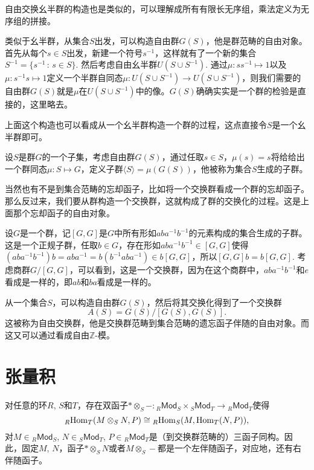 自由交换幺半群的构造也是类似的，可以理解成所有有限长无序组，乘法定义为无序组的拼接。

\begin{para}
类似于幺半群，从集合$S$出发，可以构造自由群$G(S)$，他是群范畴的自由对象。首先从每个$s\in S$出发，新建一个符号$s^{-1}$，这样就有了一个新的集合$S^{-1}=\{s^{-1}\,:\, s\in S\}$. 然后考虑自由幺半群$U(S\cup S^{-1})$. 通过$\mu: ss^{-1}\mapsto 1$以及$\mu: s^{-1}s\mapsto 1$定义一个半群自同态$\mu:U(S\cup S^{-1})\to U(S\cup S^{-1})$，则我们需要的自由群$G(S)$就是$\mu$在$U(S\cup S^{-1})$中的像。$G(S)$确确实实是一个群的检验是直接的，这里略去。
\end{para}

上面这个构造也可以看成从一个幺半群构造一个群的过程，这点直接令$S$是一个幺半群即可。

\para 设$S$是群$G$的一个子集，考虑自由群$G(S)$，通过任取$s\in S$，$\mu(s)=s$将给给出一个群同态$\mu:S\mapsto G$，定义子群$\langle S\rangle=\mu(G(S))$，他被称为集合$S$生成的子群。

\begin{para}
当然也有不是到集合范畴的忘却函子，比如将一个交换群看成一个群的忘却函子。那么反过来，我们要从群构造一个交换群，这就构成了群的交换化的过程。这是上面那个忘却函子的自由对象。

设$G$是一个群，记$[G,G]$是$G$中所有形如$aba^{-1}b^{-1}$的元素构成的集合生成的子群。这是一个正规子群，任取$b\in G$，存在形如$aba^{-1}b^{-1}\in [G,G]$使得$(aba^{-1}b^{-1})b=aba^{-1}=b(b^{-1}aba^{-1})\in b[G,G]$，所以$[G,G]b=b[G,G]$. 考虑商群$G/[G,G]$，可以看到，这是一个交换群，因为在这个商群中，$aba^{-1}b^{-1}$和$e$看成是一样的，即$ab$和$ba$看成是一样的。

从一个集合$S$，可以构造自由群$G(S)$，然后将其交换化得到了一个交换群
\[
	A(S)=G(S)/[G(S),G(S)].
\]
这被称为自由交换群，他是交换群范畴到集合范畴的遗忘函子伴随的自由对象。而这又可以通过看成自由$\mathbb{Z}$-模。
\end{para}

\section{张量积}

\begin{thm}\label{thmten}
对任意的环$R$, $S$和$T$，存在双函子$*\otimes_S -:{}_R\mathsf{Mod}_S\times {}_S\mathsf{Mod}_T\to {}_R\mathsf{Mod}_T$使得
\[
	{}_R\!\operatorname{Hom}_{T}(M\otimes_S N,P)\cong {}_R\!\operatorname{Hom}_S(M,\operatorname{Hom}_{T}(N,P)),
\]
对$M\in {}_R\mathsf{Mod}_S$, $N\in {}_S\mathsf{Mod}_T$, $P\in {}_R\mathsf{Mod}_T$是（到交换群范畴的）三函子同构。因此，固定$M$, $N$，函子$*\otimes_S N$或者$M\otimes_S -$都是一个左伴随函子，对应地，还有右伴随函子。
\end{thm}

